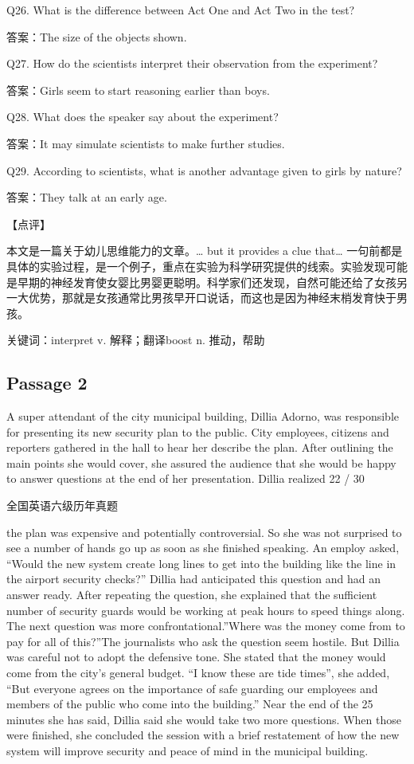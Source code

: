\documentclass[UTF8,11pt]{ctexart}
\begin{document}
Q26. What is the difference between Act One and Act Two in the test?


答案：The size of the objects shown.


Q27. How do the scientists interpret their observation from the experiment?


答案：Girls seem to start reasoning earlier than boys.


Q28. What does the speaker say about the experiment?


答案：It may simulate scientists to make further studies.


Q29. According to scientists, what is another advantage given to girls by nature?


答案：They talk at an early age.


【点评】


本文是一篇关于幼儿思维能力的文章。… but it provides a clue that… 一句前都是具体的实验过程，是一个例子，重点在实验为科学研究提供的线索。实验发现可能是早期的神经发育使女婴比男婴更聪明。科学家们还发现，自然可能还给了女孩另一大优势，那就是女孩通常比男孩早开口说话，而这也是因为神经末梢发育快于男孩。


关键词：interpret v. 解释；翻译boost n. 推动，帮助


\subsection*{Passage 2}


A super attendant of the city municipal building, Dillia Adorno, was responsible for presenting its new security plan to the public. City employees, citizens and reporters gathered in the hall to hear her describe the plan. After outlining the main points she would cover, she assured the audience that she would be happy to answer questions at the end of her presentation. Dillia realized 22 / 30


全国英语六级历年真题


the plan was expensive and potentially controversial. So she was not surprised to see a number of hands go up as soon as she finished speaking. An employ asked, “Would the new system create long lines to get into the building like the line in the airport security checks?” Dillia had anticipated this question and had an answer ready. After repeating the question, she explained that the sufficient number of security guards would be working at peak hours to speed things along. The next question was more confrontational.”Where was the money come from to pay for all of this?”The journalists who ask the question seem hostile. But Dillia was careful not to adopt the defensive tone. She stated that the money would come from the city’s general budget. “I know these are tide times”, she added, “But everyone agrees on the importance of safe guarding our employees and members of the public who come into the building.” Near the end of the 25 minutes she has said, Dillia said she would take two more questions. When those were finished, she concluded the session with a brief restatement of how the new system will improve security and peace of mind in the municipal building.
\end{document}
